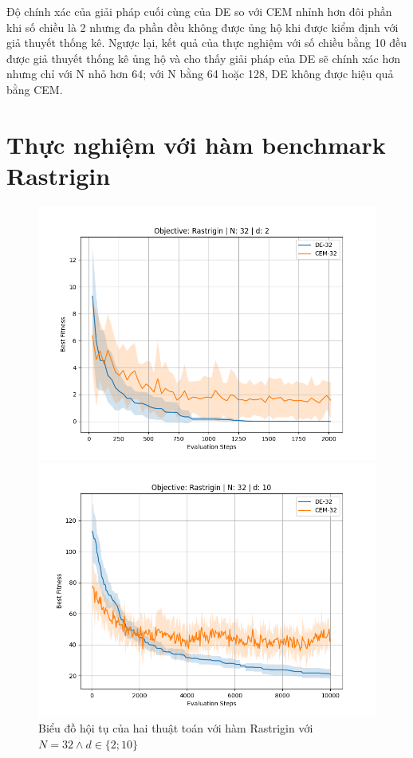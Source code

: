 \documentclass[10pt]{report}
\begin{document}
Độ chính xác của giải pháp cuối cùng của DE so với CEM nhỉnh hơn đôi phần khi số chiều là 2 nhưng đa phần đều không được ủng hộ khi được kiểm định với giả thuyết thống kê. Ngược lại, kết quả của thực nghiệm với số chiều bằng 10 đều được giả thuyết thống kê ủng hộ và cho thấy giải pháp của DE sẽ chính xác hơn nhưng chỉ với N nhỏ hơn 64; với N bằng 64 hoặc 128, DE không được hiệu quả bằng CEM.

\section{Thực nghiệm với hàm benchmark Rastrigin}
\begin{figure}[H]\centering
	\label{figure:rastrigin_comparison}
	\caption{Biểu đồ hội tụ của hai thuật toán với hàm Rastrigin với \(N = 32 \wedge d \in \{2; 10\}\)}
	\begin{minipage}{0.45\textwidth}\centering
		\includegraphics[width=\textwidth]{../assets/graphs/objective=Rastrigin_N=32_d=2.png}
	\end{minipage}
	\begin{minipage}{0.45\textwidth}\centering
		\includegraphics[width=\textwidth]{../assets/graphs/objective=Rastrigin_N=32_d=10.png}
	\end{minipage}
\end{figure}
\end{document}
